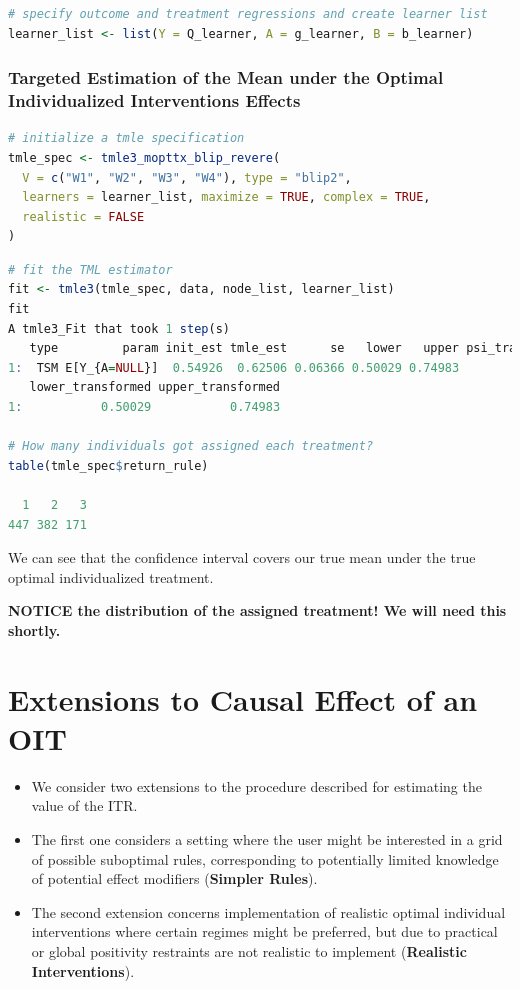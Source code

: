 \documentclass[
  12pt, krantz2,
]{book}
\theoremstyle{definition}
\theoremstyle{definition}
\theoremstyle{definition}
\newcommand{\1}{\mathbbm{1}}
\begin{document}
\begin{lstlisting}[language=R]
# specify outcome and treatment regressions and create learner list
learner_list <- list(Y = Q_learner, A = g_learner, B = b_learner)
\end{lstlisting}

\hypertarget{targeted-estimation-of-the-mean-under-the-optimal-individualized-interventions-effects-1}{%
\subsubsection{Targeted Estimation of the Mean under the Optimal Individualized Interventions Effects}\label{targeted-estimation-of-the-mean-under-the-optimal-individualized-interventions-effects-1}}

\begin{lstlisting}[language=R]
# initialize a tmle specification
tmle_spec <- tmle3_mopttx_blip_revere(
  V = c("W1", "W2", "W3", "W4"), type = "blip2",
  learners = learner_list, maximize = TRUE, complex = TRUE,
  realistic = FALSE
)
\end{lstlisting}

\begin{lstlisting}[language=R]
# fit the TML estimator
fit <- tmle3(tmle_spec, data, node_list, learner_list)
fit
A tmle3_Fit that took 1 step(s)
   type         param init_est tmle_est      se   lower   upper psi_transformed
1:  TSM E[Y_{A=NULL}]  0.54926  0.62506 0.06366 0.50029 0.74983         0.62506
   lower_transformed upper_transformed
1:           0.50029           0.74983

# How many individuals got assigned each treatment?
table(tmle_spec$return_rule)

  1   2   3 
447 382 171 
\end{lstlisting}

We can see that the confidence interval covers
our true mean under the true optimal individualized treatment.

\textbf{NOTICE the distribution of the assigned treatment! We will need this shortly.}

\hypertarget{extensions-to-causal-effect-of-an-oit}{%
\section{Extensions to Causal Effect of an OIT}\label{extensions-to-causal-effect-of-an-oit}}

\begin{itemize}
\item
  We consider two extensions to the procedure described for
  estimating the value of the ITR.
\item
  The first one considers a setting where the user
  might be interested in a grid of possible suboptimal rules, corresponding to
  potentially limited knowledge of potential effect modifiers (\textbf{Simpler Rules}).
\item
  The second extension concerns implementation of realistic optimal individual
  interventions where certain regimes might be preferred, but due to practical or
  global positivity restraints are not realistic to implement (\textbf{Realistic Interventions}).
\end{itemize}
\end{document}
